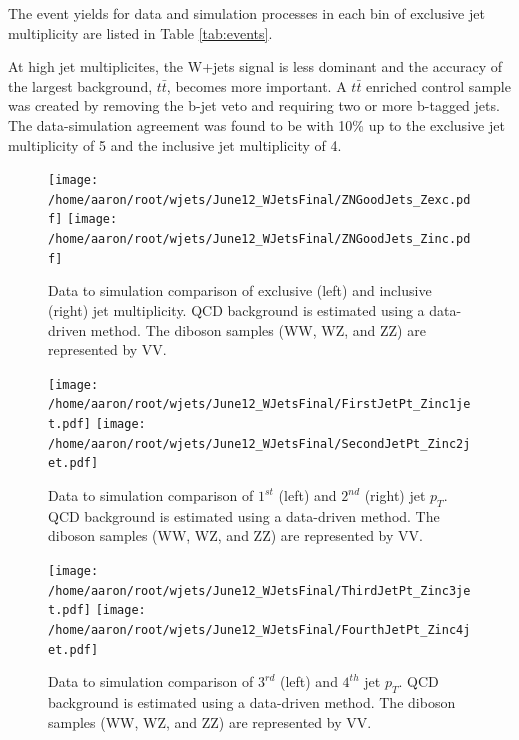 \documentclass[oneside, letterpaper, oldfontcommands]{memoir}
\begin{document}
\qquad The event yields for data and simulation processes in each bin of exclusive jet multiplicity are listed in Table \ref{tab:events}.

\qquad At high jet multiplicites, the W+jets signal is less dominant and the accuracy of the largest background, $t\bar{t}$, becomes more important. A $t\bar{t}$ enriched control sample was created by removing the b-jet veto and requiring two or more b-tagged jets. The data-simulation agreement was found to be with 10\% up to the exclusive jet multiplicity of 5 and the inclusive jet multiplicity of 4. 

\begin{figure}[!Hhtbp]
\begin{center}
\texttt{[image: /home/aaron/root/wjets/June12\_WJetsFinal/ZNGoodJets\_Zexc.pdf]}
\texttt{[image: /home/aaron/root/wjets/June12\_WJetsFinal/ZNGoodJets\_Zinc.pdf]}
\end{center}
\caption{Data to simulation comparison of exclusive (left) and inclusive (right) jet multiplicity. QCD background is estimated using a data-driven method. The diboson samples (WW, WZ, and ZZ) are represented by VV.}
\label{mult}
\end{figure}

\begin{figure}[!Hhtbp]
\begin{center}
\texttt{[image: /home/aaron/root/wjets/June12\_WJetsFinal/FirstJetPt\_Zinc1jet.pdf]}
\texttt{[image: /home/aaron/root/wjets/June12\_WJetsFinal/SecondJetPt\_Zinc2jet.pdf]}\\
\end{center}
\caption{Data to simulation comparison of $1^{st}$ (left) and $2^{nd}$ (right) jet $p_{T}$. QCD background is estimated using a data-driven method. The diboson samples (WW, WZ, and ZZ) are represented by VV.}
\label{pt12}
\end{figure}

\begin{figure}[!Hhtbp]
\begin{center}
\texttt{[image: /home/aaron/root/wjets/June12\_WJetsFinal/ThirdJetPt\_Zinc3jet.pdf]}
\texttt{[image: /home/aaron/root/wjets/June12\_WJetsFinal/FourthJetPt\_Zinc4jet.pdf]}
\end{center}
\caption{Data to simulation comparison of $3^{rd}$ (left) and $4^{th}$ jet $p_{T}$. QCD background is estimated using a data-driven method. The diboson samples (WW, WZ, and ZZ) are represented by VV.}
\label{pt34}
\end{figure}
\end{document}
